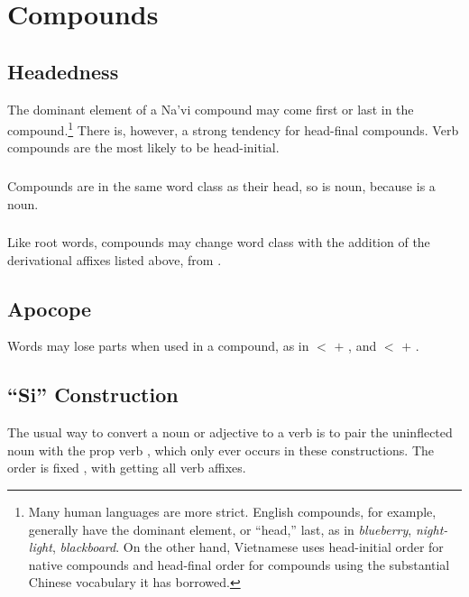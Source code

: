 \newpage
\section{Compounds}

\subsection{Headedness} The dominant element of a Na'vi compound may
come first or last in the compound.\footnote{Many human languages are
more strict.  English compounds, for example, generally have the
dominant element, or ``head,'' last, as in \textit{blueberry},
\textit{night-light}, \textit{blackboard}.  On the other hand,
Vietnamese uses head-initial order for native compounds and
head-final order for compounds using the substantial Chinese
vocabulary it has borrowed.}  There is, however, a strong tendency
for head-final compounds.  Verb compounds are the most likely to be
head-initial.

\subsubsection{} Compounds are in the same word class as their head,
so   is noun, because   is a
noun.

\subsubsection{} Like root words, compounds may change word class with
the addition of the derivational affixes listed above,
  from  .


\subsection{Apocope} Words may lose parts when used in a compound, as
in   $<$   $+$
 , and   $<$
  $+$  .


\subsection{``Si'' Construction} The usual way to convert a noun or
adjective to a verb is to pair the uninflected noun with the prop verb
, which only ever occurs in these constructions.  The order is
fixed , with  getting all verb affixes.\label{lingop:si-const}

